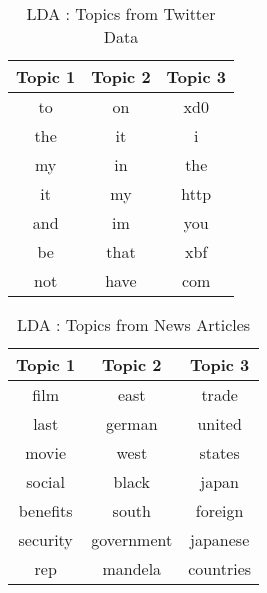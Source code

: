 \begin{table}
	\centering
    \begin{tabular}{|c|c|c|}
    \hline

    \multicolumn{1}{|c|}{\textbf{Topic 1}} & \multicolumn{1}{|c|}{\textbf{Topic 2}} & \multicolumn{1}{|c|}{\textbf{Topic 3}} \\
    \hline
    to  & on   & xd0  \\ 
    the & it   & i    \\ 
     my & in   & the  \\ 
     it & my   & http \\
    and & im   & you  \\ 
     be & that & xbf  \\ 
    not & have & com  \\ 
    \hline
    \end{tabular}
    \caption {LDA : Topics from Twitter Data }
\end{table}

\begin{table}
	\centering
    \begin{tabular}{|c|c|c|}
    \hline
    \multicolumn{1}{|c|}{\textbf{Topic 1}} & \multicolumn{1}{|c|}{\textbf{Topic 2}} & \multicolumn{1}{|c|}{\textbf{Topic 3}} \\
    \hline
 film	& east	& trade \\ 
 last	& german	& united \\ 
 movie	& west	& states \\ 
 social	& black	& japan \\ 
 benefits	& south	& foreign \\ 
 security	& government	& japanese \\ 
 rep	& mandela	& countries \\ 
 	\hline
     \end{tabular}
     \caption {LDA : Topics from News Articles }
\end{table}